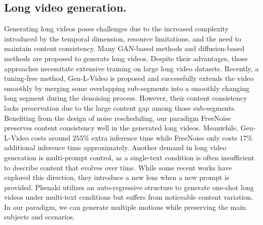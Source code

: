 \subsection{Long video generation.}
%
Generating long videos poses challenges due to the increased complexity introduced by the temporal dimension, resource limitations, and the need to maintain content consistency. Many GAN-based methods \citep{skorokhodov2022stylegan,brooks2022generating,ge2022long} and diffusion-based methods \citep{harvey2022flexible,voleti2022mcvd,yu2023video,lvdm,yin2023nuwa,ho2022imagen} are proposed to generate long videos. Despite their advantages, those approaches necessitate extensive training on large long video datasets.
%
Recently, a tuning-free method, Gen-L-Video \citep{wang2023gen} is proposed and successfully extends the video smoothly by merging some overlapping sub-segments into a smoothly changing long segment during the denoising process. However, their content consistency lacks preservation due to the large content gap among those sub-segments. Benefiting from the design of noise rescheduling, our paradigm FreeNoise preserves content consistency well in the generated long videos. Meanwhile, Gen-L-Video costs around $255\%$ extra inference time while FreeNoise only costs $17\%$ additional inference time approximately.
%
Another demand in long video generation is multi-prompt control, as a single-text condition is often insufficient to describe content that evolves over time. While some recent works \citep{yin2023nuwa,he2023animate,wang2023gen} have explored this direction, they introduce a new lens when a new prompt is provided. Phenaki \citep{villegas2022phenaki} utilizes an auto-regressive structure to generate one-shot long videos under multi-text conditions but suffers from noticeable content variation. In our paradigm, we can generate multiple motions while preserving the main subjects and scenarios.



